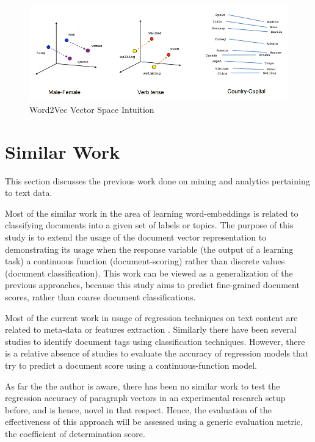 \documentclass[conference]{IEEEtran}
\begin{document}
\begin{figure}[ht]
    \centering
    \includegraphics[width=\textwidth]{images/word2vec_1.png}
    \caption{Word2Vec Vector Space Intuition\cite{tensorflow_word2vec}}
    \label{fig:word2vec-vectorspace-intuition}
\end{figure}

\vspace{5mm}

\section{Similar Work}
    This section discusses the previous work done on mining and analytics pertaining to text data.

    Most of the similar work in the area of learning word-embeddings is related to classifying documents into a given set of labels or topics. 
    The purpose of this study is to extend the usage of the document vector representation to demonstrating its usage when the response variable (the output of a learning task) a continuous function (document-scoring) rather than discrete values (document classification). 
    This work can be viewed as a generalization of the previous approaches, because this study aims to predict fine-grained document scores, rather than coarse document classifications.

    Most of the current work in usage of regression techniques on text content are related to meta-data or features extraction \cite{su2015genetic} \cite{weissman2016natural}.
    Similarly there have been several studies to identify document tags using classification techniques\cite{bespalov2011sentiment}\cite{pang2002thumbs}. 
    However, there is a relative absence of studies to evaluate the accuracy of regression models that try to predict a document score using a continuous-function model.

    As far the the author is aware, there has been no similar work to test the regression accuracy of paragraph vectors in an experimental research setup before, and is hence, novel in that respect.
    Hence, the evaluation of the effectiveness of this approach will be assessed using a generic evaluation metric, the coefficient of determination score.
\end{document}
